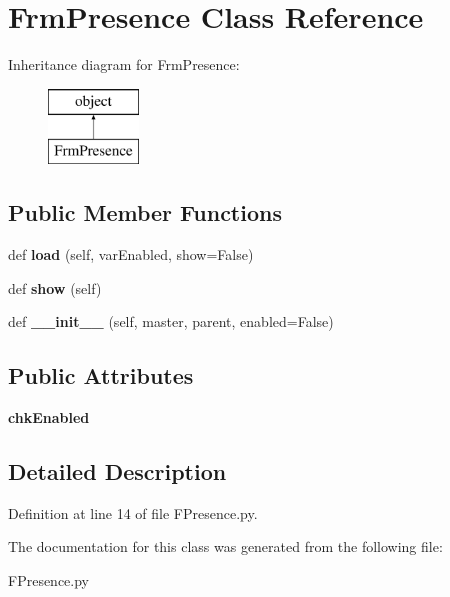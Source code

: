 \hypertarget{class_f_presence_1_1_frm_presence}{}\section{Frm\+Presence Class Reference}
\label{class_f_presence_1_1_frm_presence}
Inheritance diagram for Frm\+Presence\+:\begin{figure}[H]
\begin{center}
\leavevmode
\includegraphics[height=2.000000cm]{class_f_presence_1_1_frm_presence}
\end{center}
\end{figure}
\subsection*{Public Member Functions}
\begin{DoxyCompactItemize}
\item 
\mbox{\label{class_f_presence_1_1_frm_presence_a38f4c0a1b0b9f14e89e7670d417e140a}} 
def {\bfseries load} (self, var\+Enabled, show=False)
\item 
\mbox{\label{class_f_presence_1_1_frm_presence_ab4f4398c3f210fe4ea6e720401357691}} 
def {\bfseries show} (self)
\item 
\mbox{\label{class_f_presence_1_1_frm_presence_adffadd9833af4759460d71b7d00bbf4c}} 
def {\bfseries \+\_\+\+\_\+init\+\_\+\+\_\+} (self, master, parent, enabled=False)
\end{DoxyCompactItemize}
\subsection*{Public Attributes}
\begin{DoxyCompactItemize}
\item 
\mbox{\label{class_f_presence_1_1_frm_presence_aa5ba96b8972782a03e3d83def0f965a9}} 
{\bfseries chk\+Enabled}
\end{DoxyCompactItemize}


\subsection{Detailed Description}


Definition at line 14 of file F\+Presence.\+py.



The documentation for this class was generated from the following file\+:\begin{DoxyCompactItemize}
\item 
F\+Presence.\+py\end{DoxyCompactItemize}
